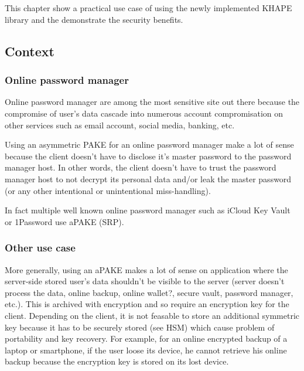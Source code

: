 \documentclass[../report.tex]{subfiles}
\begin{document}
\chapter{} \label{cha:use_case}

This chapter show a practical use case of using the newly implemented KHAPE library and the demonstrate the security benefits.

\section{Context} \label{sec:usecase_context}

\subsection{Online password manager}
Online password manager are among the most sensitive site out there because the compromise of user's data cascade into numerous account compromisation on other services such as email account, social media, banking, etc.

Using an asymmetric PAKE for an online password manager make a lot of sense because the client doesn't have to disclose it's master password to the password manager host. In other words, the client doesn't have to trust the password manager host to not decrypt its personal data and/or leak the master password (or any other intentional or unintentional miss-handling).

In fact multiple well known online password manager such as iCloud Key Vault or 1Password use aPAKE (SRP).

\subsection{Other use case}

More generally, using an aPAKE makes a lot of sense on application where the server-side stored user's data shouldn't be visible to the server (server doesn't process the data, online backup, online wallet?, secure vault, password manager, etc.). This is archived with encryption and so require an encryption key for the client.
Depending on the client, it is not feasable to store an additional symmetric key because it has to be securely stored (see HSM) which cause problem of portability and key recovery. For example, for an online encrypted backup of a laptop or smartphone, if the user loose its device, he cannot retrieve his online backup because the encryption key is stored on its lost device.
\end{document}

